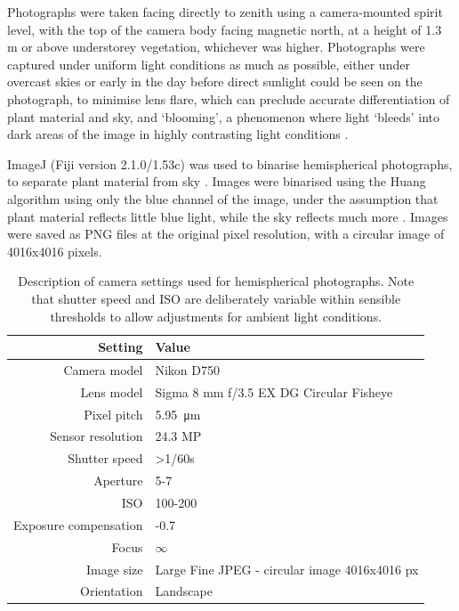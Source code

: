 \documentclass[11pt,a4paper]{article}
\begin{document}
Photographs were taken facing directly to zenith using a camera-mounted spirit level, with the top of the camera body facing magnetic north, at a height of 1.3 m or above understorey vegetation, whichever was higher. Photographs were captured under uniform light conditions as much as possible, either under overcast skies or early in the day before direct sunlight could be seen on the photograph, to minimise lens flare, which can preclude accurate differentiation of plant material and sky, and `blooming', a phenomenon where light `bleeds' into dark areas of the image in highly contrasting light conditions \citep{Frazer2001}.

ImageJ (Fiji version 2.1.0/1.53c) was used to binarise hemispherical photographs, to separate plant material from sky \citep{Schneider2012}. Images were binarised using the Huang algorithm \citep{Huang1995} using only the blue channel of the image, under the assumption that plant material reflects little blue light, while the sky reflects much more \citep{Brusa2014}. Images were saved as PNG files at the original pixel resolution, with a circular image of 4016x4016 pixels.

\begin{table}
\centering 
  \caption{Description of camera settings used for hemispherical photographs. Note that shutter speed and ISO are deliberately variable within sensible thresholds to allow adjustments for ambient light conditions.} 
  \label{camera_settings} 
\begin{tabular}{rl} 
	\toprule
{Setting} & {Value} \\
	\midrule
Camera model & Nikon D750 \\
Lens model & Sigma 8 mm f/3.5 EX DG Circular Fisheye \\
Pixel pitch & \SI{5.95}{\micro\meter} \\
Sensor resolution & 24.3 MP \\
Shutter speed & >1/60s \\
Aperture & 5-7 \\
ISO & 100-200 \\
Exposure compensation & -0.7 \citep{Brusa2014} \\
Focus & $\infty$ \citep{Hu2009, Frazer2001}\\
Image size & Large Fine JPEG - circular image 4016x4016 px \\
Orientation & Landscape \\
\bottomrule
\end{tabular} 
\end{table} 
\end{document}
